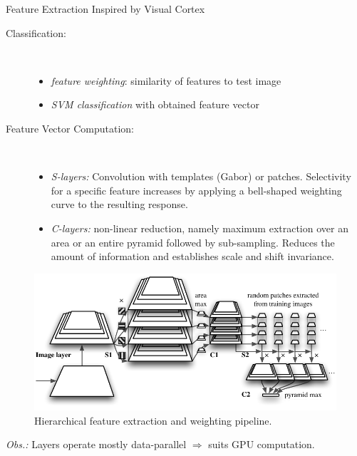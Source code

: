 \documentclass[final]{beamer}
\begin{document}
\begin{frame}{}
\begin{columns}[t]
\begin{column}{.48\linewidth}
\begin{block} {Feature Extraction Inspired by Visual Cortex}
\begin{description}
\item[Classification:]~
\begin{itemize}
	\item  \emph{feature weighting}: similarity of features to test image
	\item  \emph{SVM classification} with obtained feature vector
\end{itemize}

\item[Feature Vector Computation:]~ %
\begin{itemize}
\item
\emph{S-layers:} Convolution with templates (Gabor) or patches.
Selectivity for a specific feature increases by applying a bell-shaped weighting curve to the resulting response.
\item \emph{C-layers:} non-linear reduction, namely maximum
  extraction over an area or an entire pyramid followed by
  sub-sampling. Reduces the amount of information and establishes
 scale and shift invariance.\newline
\end{itemize}
\end{description}

\begin{figure}[tb]
\centering
\includegraphics[width=.7\linewidth]{images/pyramidp}
\caption{
  Hierarchical feature extraction and weighting pipeline.
}
\label{fig:pyramid}
\end{figure}
\emph{Obs.:} Layers operate mostly data-parallel $\Rightarrow$ suits GPU computation.\newline
        \end{block}


\end{column}
\end{columns}
\end{frame}
\end{document}
